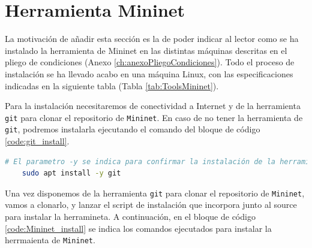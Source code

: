 \newpage
\section{Herramienta Mininet}
\label{sec:ToolsMininet}
La motivación de añadir esta sección es la de poder indicar al lector como se ha instalado la herramienta de Mininet en las distintas máquinas descritas en el pliego de condiciones (Anexo \ref{ch:anexoPliegoCondiciones}). Todo el proceso de instalación se ha llevado acabo en una máquina Linux, con las especificaciones indicadas en la siguiente tabla (Tabla \ref{tab:ToolsMininet}).

\begin{table}[ht!]
    \centering
    \caption{Especificaciones máquina de instalación Mininet}
    \label{tab:ToolsMininet}
\end{table}

Para la instalación necesitaremos de conectividad a Internet y de la herramienta \texttt{git} para clonar el repositorio de \texttt{Mininet}. En caso de no tener la herramienta de \texttt{git}, podremos instalarla ejecutando el comando del bloque de código \ref{code:git_install}.

\begin{lstlisting}[language= bash, style=Consola2, caption={Instalación de la herramienta git},label=code:git_install]
    # El parametro -y se indica para confirmar la instalación de la herramienta
    sudo apt install -y git 
\end{lstlisting}
\vspace{1cm}

Una vez disponemos de la herramienta \texttt{git} para clonar el repositorio de \texttt{Mininet}, vamos a clonarlo, y lanzar el script de instalación que incorpora junto al source para instalar la herramineta. A continuación, en el bloque de código \ref{code:Mininet_install} se indica los comandos ejecutados para instalar la herrmaienta de \texttt{Mininet}.


